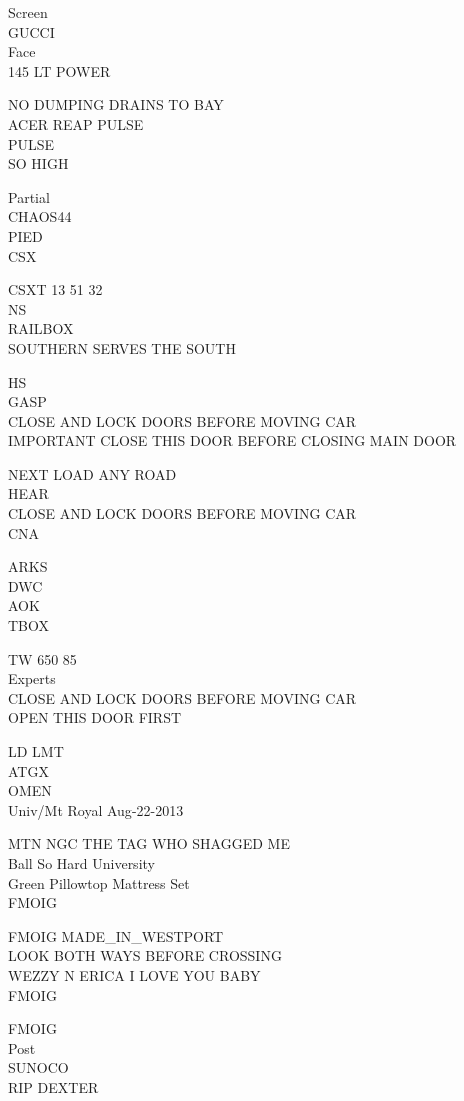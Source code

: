 \documentclass[10pt,letterpaper]{article}
\begin{document}
Screen\\
GUCCI\\
Face\\
145 LT POWER

NO DUMPING DRAINS TO BAY\\
ACER REAP PULSE\\
PULSE\\
SO HIGH

Partial\\
CHAOS44\\
PIED\\
CSX

CSXT 13 51 32\\
NS\\
RAILBOX\\
SOUTHERN SERVES THE SOUTH

HS\\
GASP\\
CLOSE AND LOCK DOORS BEFORE MOVING CAR\\
IMPORTANT CLOSE THIS DOOR BEFORE CLOSING MAIN DOOR

NEXT LOAD ANY ROAD\\
HEAR\\
CLOSE AND LOCK DOORS BEFORE MOVING CAR\\
CNA

ARKS\\
DWC\\
AOK\\
TBOX

TW 650 85\\
Experts\\
CLOSE AND LOCK DOORS BEFORE MOVING CAR\\
OPEN THIS DOOR FIRST

LD LMT\\
ATGX\\
OMEN\\
Univ/Mt Royal Aug{-}22{-}2013

MTN NGC THE TAG WHO SHAGGED ME\\
Ball So Hard University\\
Green Pillowtop Mattress Set\\
FMOIG

FMOIG MADE\_IN\_WESTPORT\\
LOOK BOTH WAYS BEFORE CROSSING\\
WEZZY N ERICA I LOVE YOU BABY\\
FMOIG

FMOIG\\
Post\\
SUNOCO\\
RIP DEXTER
\end{document}
